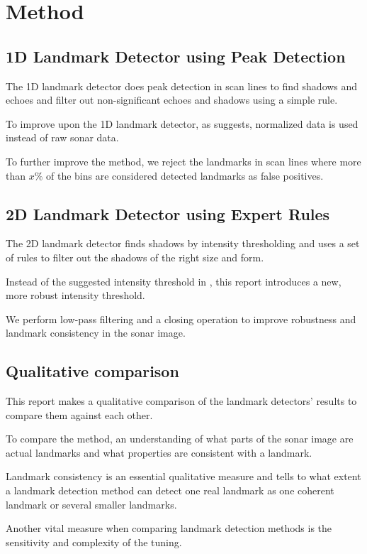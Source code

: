 \chapter{Method}

\section{1D Landmark Detector using Peak Detection}

The 1D landmark detector does peak detection in scan lines to find shadows and echoes and filter out non-significant echoes and shadows using a simple rule.

To improve upon the 1D landmark detector, as  suggests, normalized data is used instead of raw sonar data. 

To further improve the method, we reject the landmarks in scan lines where more than $x\%$ of the bins are considered detected landmarks as false positives. 

\section{2D Landmark Detector using Expert Rules}

The 2D landmark detector finds shadows by intensity thresholding and uses a set of rules to filter out the shadows of the right size and form. 

Instead of the suggested intensity threshold in , this report introduces a new, more robust intensity threshold.

We perform low-pass filtering and a closing operation to improve robustness and landmark consistency in the sonar image.

\section{Qualitative comparison}

 This report makes a qualitative comparison of the landmark detectors' results to compare them against each other.

To compare the method, an understanding of what parts of the sonar image are actual landmarks and what properties are consistent with a landmark. 

Landmark consistency is an essential qualitative measure and tells to what extent a landmark detection method can detect one real landmark as one coherent landmark or several smaller landmarks. 

Another vital measure when comparing landmark detection methods is the sensitivity and complexity of the tuning.



